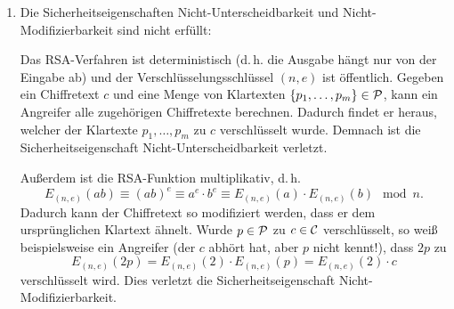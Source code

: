 \begin{enumerate}
 \item Die Sicherheitseigenschaften Nicht-Unterscheidbarkeit und Nicht-Modifizierbarkeit sind nicht erfüllt: 
 
 Das RSA-Verfahren ist deterministisch (d.\,h. die Ausgabe hängt nur von der Eingabe ab) und der Verschlüsselungsschlüssel $(n, e)$ ist öffentlich. Gegeben ein Chiffretext $c$ und eine Menge von Klartexten $\{p_1, \dots, p_m\} \in \mathcal P$, kann ein Angreifer alle zugehörigen Chiffretexte berechnen. Dadurch findet er heraus, welcher der Klartexte $p_1, \dots, p_m$ zu $c$ verschlüsselt wurde. Demnach ist die Sicherheitseigenschaft Nicht-Unterscheidbarkeit verletzt. 
 
 Außerdem ist die RSA-Funktion multiplikativ, d.\,h. 
 \[E_{(n, e)}(ab) \equiv (ab)^e \equiv a^e⋅ b^e \equiv E_{(n, e)}(a)\cdot E_{(n, e)}(b) \mod n.\]
 Dadurch kann der Chiffretext so modifiziert werden, dass er dem ursprünglichen Klartext ähnelt. Wurde $p \in \mathcal P$ zu $c \in \mathcal C$ verschlüsselt, so weiß beispielsweise ein Angreifer (der $c$ abhört hat, aber $p$ nicht kennt!), dass $2p$ zu 
 \[E_{(n, e)}(2p) = E_{(n, e)}(2)\cdot E_{(n, e)}(p) = E_{(n, e)}(2) \cdot c\]
 verschlüsselt wird. Dies verletzt die Sicherheitseigenschaft Nicht-Modifizierbarkeit.
 \end{enumerate}


 

